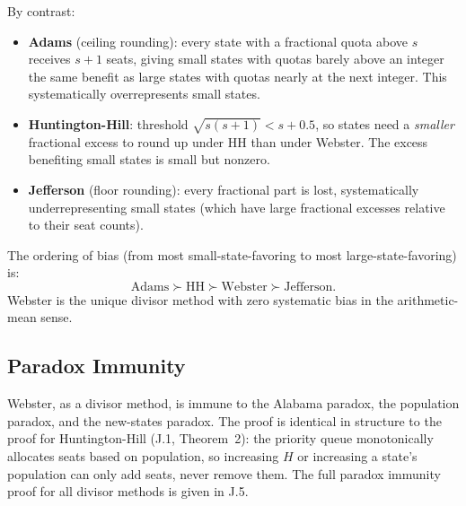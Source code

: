 By contrast:
\begin{itemize}
  \item \textbf{Adams} (ceiling rounding): every state with a fractional
    quota above $s$ receives $s+1$ seats, giving small states with
    quotas barely above an integer the same benefit as large states
    with quotas nearly at the next integer.
    This systematically overrepresents small states.
  \item \textbf{Huntington-Hill}: threshold $\sqrt{s(s+1)} < s+0.5$,
    so states need a \emph{smaller} fractional excess to round up
    under HH than under Webster.
    The excess benefiting small states is small but nonzero.
  \item \textbf{Jefferson} (floor rounding): every fractional part is
    lost, systematically underrepresenting small states
    (which have large fractional excesses relative to their seat counts).
\end{itemize}

The ordering of bias (from most small-state-favoring to most
large-state-favoring) is:
\[
\text{Adams} \succ \text{HH} \succ \text{Webster} \succ \text{Jefferson}.
\]
Webster is the unique divisor method with zero systematic bias
in the arithmetic-mean sense.

\subsection{Paradox Immunity}

Webster, as a divisor method, is immune to the Alabama paradox,
the population paradox, and the new-states paradox.
The proof is identical in structure to the proof for Huntington-Hill
(J.1, Theorem~2): the priority queue monotonically allocates seats
based on population, so increasing $H$ or increasing a state's
population can only add seats, never remove them.
The full paradox immunity proof for all divisor methods is given
in J.5.
